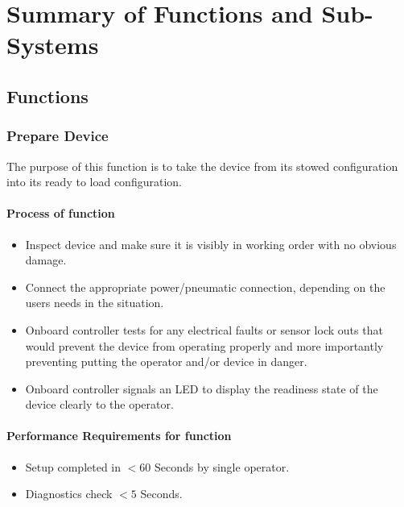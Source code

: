 \documentclass[a4paper,10pt]{article} %
\begin{document}

\newpage

\section{Summary of Functions and Sub-Systems}

\subsection{Functions}

\subsubsection{Prepare Device}

The purpose of this function is to take the device from its stowed configuration into its ready to load configuration.

\paragraph{Process of function}


\begin{itemize}
    \item Inspect device and make sure it is visibly in working order with no obvious damage.
    \item Connect the appropriate power/pneumatic connection, depending on the users needs in the situation.
    \item Onboard controller tests for any electrical faults or sensor lock outs that would prevent the device from operating properly and more importantly preventing putting the operator and/or device in danger.
    \item Onboard controller signals an LED to display the readiness state of the device clearly to the operator.
\end{itemize}

\paragraph{Performance Requirements for function}

\begin{itemize}
    \item Setup completed in $<60$ Seconds by single operator.
    \item Diagnostics check $<5$ Seconds. 
\end{itemize}
\end{document}
